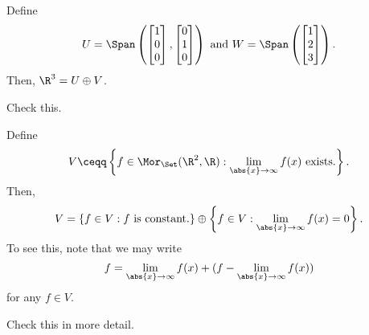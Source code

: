 \begin{exm}{}{}
	Define
	\begin{equation}
	U=\Span \left( \begin{bmatrix}1 \\ 0 \\ 0\end{bmatrix},\begin{bmatrix}0 \\ 1 \\ 0\end{bmatrix}\right) \text{ and }W=\Span \left( \begin{bmatrix}1 \\ 2 \\ 3\end{bmatrix}\right) .
	\end{equation}
	Then, $\R ^3=U\oplus V$.
	\begin{exr}[breakable=false]{}{}
		Check this.
	\end{exr}
\end{exm}
\begin{exm}{}{}
	Define
	\begin{equation}
	V\ceqq \left\{ f\in \Mor _{\Set}(\R ^2,\R ):\lim _{\abs{x}\to \infty}f(x)\text{ exists.}\right\} .
	\end{equation}
	Then,
	\begin{equation}
	V=\left\{ f\in V:f\text{ is constant.}\right\} \oplus \left\{ f\in V:\lim _{\abs{x}\to \infty}f(x)=0\right\} .
	\end{equation}
	To see this, note that we may write
	\begin{equation}
	f=\lim _{\abs{x}\to \infty}f(x)+(f-\lim _{\abs{x}\to \infty}f(x))
	\end{equation}
	for any $f\in V$.
	\begin{exr}[breakable=false]{}{}
		Check this in more detail.
	\end{exr}
\end{exm}

